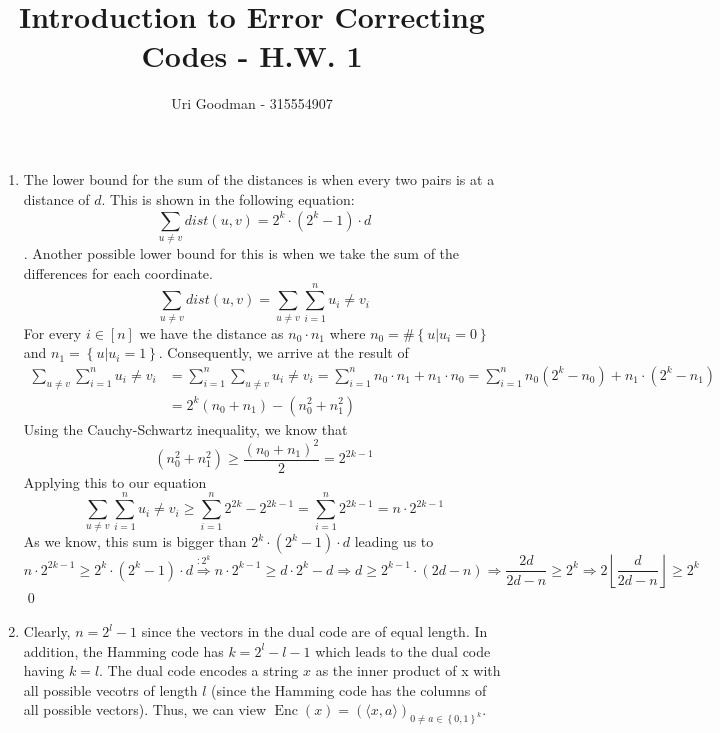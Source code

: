 \documentclass{article}
\author{Uri Goodman - 315554907}
\title{Introduction to Error Correcting Codes - H.W. 1}
\begin{document}
    \maketitle
    \begin{enumerate}
        \item
            The lower bound for the sum of the distances is when every two pairs is at a distance of $d$. This is shown in the following equation:
            \[\sum_{u\neq v}^{}dist(u,v) = 2^k\cdot\left( 2^k-1 \right)\cdot d\].
            Another possible lower bound for this is when we take the sum of the differences for each coordinate. 
            \[\sum_{u \neq v}^{}dist(u,v) = \sum_{u\neq v}^{}\sum_{i=1}^{n} u_i \neq v_i\]
            For every $i \in [n]$ we have the distance as $n_0\cdot n_1$ where $n_0=\#\left\{u|u_i =0 \right\}$ and $n_1 = \left\{ u | u_i = 1 \right\}$. Consequently, we arrive at the result of 
            \begin{align*}
                \sum_{u\neq v}^{}\sum_{i=1}^{n} u_i \neq v_i &= \sum_{i=1}^{n} \sum_{u\neq v}u_i \neq v_i = \sum_{i=1}^{n} n_0 \cdot n_1  + n_1 \cdot n_0 =\sum_{i=1}^{n}n_0 \left( 2^k -n_0 \right) + n_1\cdot \left( 2^k - n_1 \right) \\&= 2^k (n_0 +n_1) - \left( n_0 ^2 + n_1 ^2 \right) \end{align*}
            Using the Cauchy-Schwartz inequality, we know that
            \[\left( n_0^2 + n_1 ^2 \right) \ge \frac{(n_0 + n_1)^2}{2} = 2^{2k-1}\]
            Applying this to our equation
            \[
            \sum_{u\neq v}^{}\sum_{i=1}^{n} u_i \neq v_i \ge \sum_{i=1}^{n} 2^{2k} - 2^{2k-1} = \sum_{i=1}^{n} 2^{2k-1} = n\cdot 2^{2k-1}\]
            As we know, this sum is bigger than $2^k\cdot\left( 2^k-1 \right)\cdot d$ leading us to 
            \[n\cdot 2^{2k-1} \ge 2^k\cdot\left( 2^k-1 \right)\cdot d \overset{:2^k}{\Rightarrow}  n\cdot 2^{k-1} \ge d\cdot 2^k -d \Rightarrow d \ge  2^{k-1}\cdot\left( 2d-n \right)\Rightarrow \frac{2d}{2d -n} \ge 2^k \Rightarrow 2\left\lfloor \frac{d}{2d-n}\right\rfloor \ge 2^k\]\qed
        \item Clearly, $n = 2^l-1$ since the vectors in the dual code are of equal length. In addition, the Hamming code has $k = 2^l - l-1$ which leads to the dual code having $k=l$. The dual code encodes a string $x$ as the inner product of x with all possible vecotrs of length $l$ (since the Hamming code has the columns of all possible vectors). Thus, we can view $\operatorname{Enc}\left( x \right) = \left( \langle x,a\rangle \right)_{0\neq a \in \left\{ 0,1 \right\}^k}$.

\end{enumerate}
\end{document}
